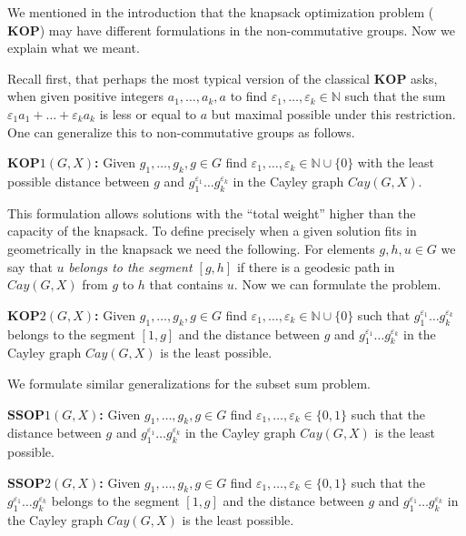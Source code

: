 \documentclass[11pt]{amsart}
\theoremstyle{definition}
\def\KOP{{\mathbf{KOP}}}
\def\SSOP{{\mathbf{SSOP}}}
\begin{document}
We mentioned in the introduction that the knapsack optimization problem ($\KOP$) may have different formulations in the non-commutative groups.
Now we explain what we meant.

 Recall first, that perhaps the most typical version of the classical $\KOP$ asks, when given positive integers $a_1, \ldots, a_k,a$ to find $\varepsilon_1, \ldots, \varepsilon_k \in \mathbb{N}$ such that the sum  $ \varepsilon_1a_1 + \ldots +  \varepsilon_ka_k$ is less or equal to $a$ but  maximal possible under this restriction.  One can  generalize this  to  non-commutative groups as follows.

 \medskip \noindent
 {\bf $\KOP1(G,X)$\index{$\KOP1(G,X)$}:} Given $g_1,\ldots,g_k,g\in G$
find $\varepsilon_1, \ldots, \varepsilon_k \in \mathbb{N}\cup\{0\}$ with the least
possible distance between $g$ and $g_1^{\varepsilon_1} \ldots g_k^{\varepsilon_k}$ in the Cayley graph $Cay(G,X)$. 

\medskip
 This formulation allows solutions with the ``total weight'' higher than the capacity of the knapsack. To define precisely when a given solution fits in geometrically  in the knapsack we need the following. For elements  $g, h, u \in G$  we say that $u$  {\it belongs to the segment $[g,h]$} if there is a geodesic path in $Cay(G,X)$ from $g$ to $h$ that contains $u$.   Now we can formulate the problem.

  \medskip \noindent
 {\bf $\KOP2(G,X)$\index{$\KOP2(G,X)$}:} Given $g_1,\ldots,g_k,g\in G$
find $\varepsilon_1, \ldots, \varepsilon_k \in \mathbb{N}\cup\{0\}$ such that $g_1^{\varepsilon_1} \ldots g_k^{\varepsilon_k}$ belongs to the segment $[1,g]$ and the distance between $g$ and $g_1^{\varepsilon_1} \ldots g_k^{\varepsilon_k}$ in the Cayley graph $Cay(G,X)$ is the least possible.


\medskip

We formulate similar generalizations for the subset sum problem.

 \medskip \noindent
 {\bf $\SSOP1(G,X)$\index{$\SSOP1(G,X)$}:} Given $g_1,\ldots,g_k,g\in G$
find $\varepsilon_1, \ldots, \varepsilon_k \in \{0,1\}$ such that the distance between $g$ and $g_1^{\varepsilon_1} \ldots g_k^{\varepsilon_k}$ in the Cayley graph $Cay(G,X)$ is the least possible.

   \medskip \noindent
  {\bf $\SSOP2(G,X)$\index{$\SSOP1(G,X)$}:} Given $g_1,\ldots,g_k,g\in G$
 find $\varepsilon_1, \ldots, \varepsilon_k \in \{0,1\}$ such that the $g_1^{\varepsilon_1} \ldots g_k^{\varepsilon_k}$ belongs to the segment $[1,g]$ and the distance between $g$ and $g_1^{\varepsilon_1} \ldots g_k^{\varepsilon_k}$ in the Cayley graph $Cay(G,X)$ is the least possible.
\end{document}
